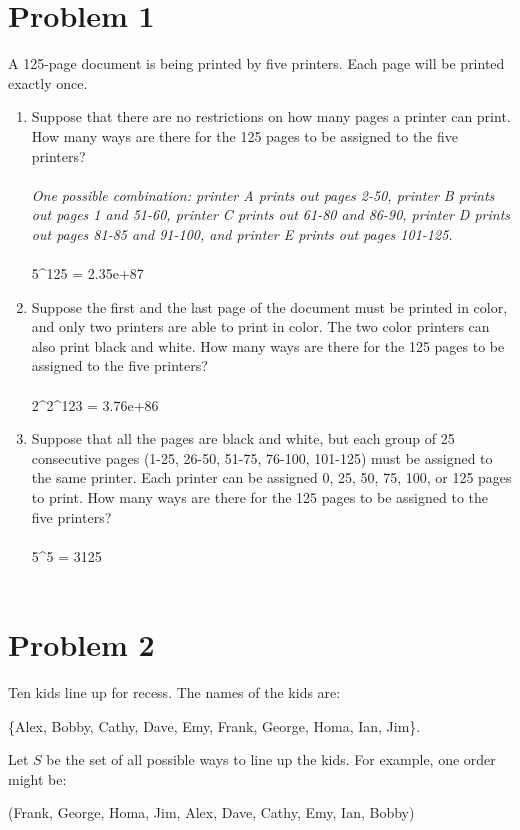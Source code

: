 \documentclass{amsart}
\theoremstyle{definition}
\theoremstyle{Exercise}
\theoremstyle{remark}
\theoremstyle{rule}
\numberwithin{equation}{section}
\begin{document}
\section*{Problem 1}

A 125-page document is being printed by five printers. Each page will be printed exactly once.
\begin{enumerate}[label=(\alph*)]
\item  Suppose that there are no restrictions on how many pages a printer can print. How many ways are there for the 125 pages to be assigned to the five printers?\\\\
{\it One possible combination: printer A prints out pages 2-50, printer B prints out pages 1 and 51-60, printer C prints out 61-80 and 86-90, printer D prints out pages 81-85 and 91-100, and printer E prints out pages 101-125.}\\\\
5^{125} = 2.35e+87

\item Suppose the first and the last page of the document must be printed in color, and only two printers are able to print in color. The two color printers can also print black and white. How many ways are there for the 125 pages to be assigned to the five printers?\\\\
2^{2}^{123} = 3.76e+86

\item Suppose that all the pages are black and white, but each group of 25 consecutive pages (1-25, 26-50, 51-75, 76-100, 101-125) must be assigned to the same printer. Each printer can be assigned 0, 25, 50, 75, 100, or 125 pages to print. How many ways are there for the 125 pages to be assigned to the five printers?\\\\
5^{5} = 3125
\\\\
\end{enumerate}
\newpage

\section*{Problem 2}
Ten kids line up for recess. The names of the kids are:\\
\begin{center}
 \{Alex, Bobby, Cathy, Dave, Emy, Frank, George, Homa, Ian, Jim\}.\\
\end{center}
Let $S$ be the set of all possible ways to line up the kids. For example, one order might be:
\begin{center}
  (Frank, George, Homa, Jim, Alex, Dave, Cathy, Emy, Ian, Bobby)\\
\end{center}
\end{document}
